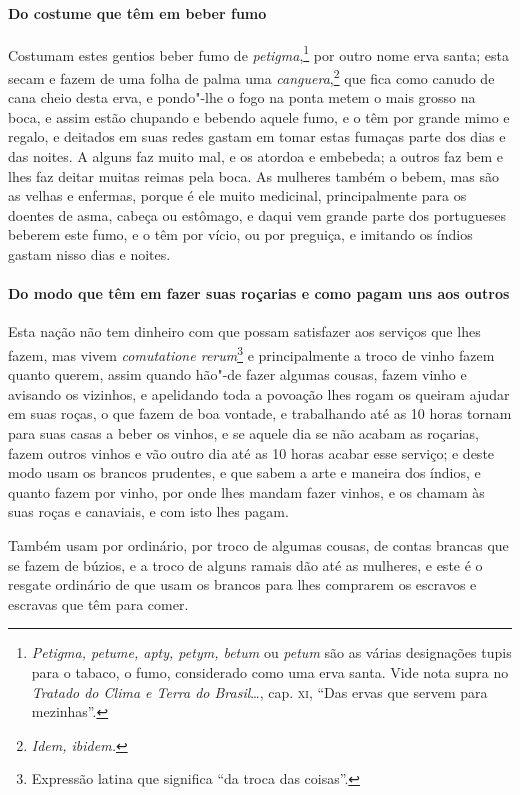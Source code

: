 \begin{linenumbers}
\paragraph{Do costume que têm em beber fumo} \quad
Costumam estes gentios beber fumo de \textit{petigma},\footnote{ \textit{Petigma, 
petume, apty, petym, betum} ou \textit{petum} são as várias designações tupis para o tabaco, o fumo,
considerado como uma erva santa. Vide nota supra no \textit{Tratado do
Clima e Terra do Brasil}\ldots{}, cap. \textsc{xi}, ``Das ervas que servem
para mezinhas''.} por outro nome erva santa; esta
secam e fazem de uma folha de palma uma \textit{canguera},\footnote{ \textit{Idem, ibidem.}} 
que fica como canudo de cana cheio desta erva, e pondo"-lhe o fogo na ponta metem o mais grosso na boca, e
assim estão chupando e bebendo aquele fumo, e o têm por grande mimo e
regalo, e deitados em suas redes gastam em tomar estas fumaças parte
dos dias e das noites. A alguns faz muito mal, e os atordoa e embebeda;
a outros faz bem e lhes faz deitar muitas reimas pela boca. As mulheres
também o bebem, mas são as velhas e enfermas, porque é ele muito
medicinal, principalmente para os doentes de asma, cabeça ou estômago,
e daqui vem grande parte dos portugueses beberem este fumo, e o têm por
vício, ou por preguiça, e imitando os índios gastam nisso dias e noites.

\paragraph{Do modo que têm em fazer suas roçarias e como pagam uns aos outros} \quad
Esta nação não tem dinheiro com que possam satisfazer aos
serviços que lhes fazem, mas vivem \textit{comutatione rerum}\footnote{ Expressão latina que significa ``da troca das coisas''.} e
principalmente a troco de vinho fazem quanto querem, assim quando
hão"-de fazer algumas cousas, fazem vinho e avisando os vizinhos, e
apelidando toda a povoação lhes rogam os queiram ajudar em suas roças,
o que fazem de boa vontade, e trabalhando até as 10 horas tornam para
suas casas a beber os vinhos, e se aquele dia se não acabam as
roçarias, fazem outros vinhos e vão outro dia até as 10 horas acabar
esse serviço; e deste modo usam os brancos prudentes, e que sabem a
arte e maneira dos índios, e quanto fazem por vinho, por onde lhes
mandam fazer vinhos, e os chamam às suas roças e canaviais, e com isto lhes pagam.

 Também usam por ordinário, por troco de algumas cousas, de contas
brancas que se fazem de búzios, e a troco de alguns ramais dão até as
mulheres, e este é o resgate ordinário de que usam os brancos para lhes
comprarem os escravos e escravas que têm para comer.


\end{linenumbers}
